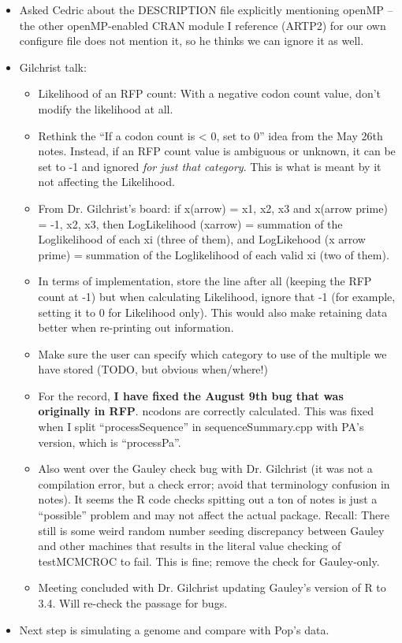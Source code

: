 \documentclass[12pt,hyperref]{labbook}
\begin{document}

\begin{itemize}
    \item Asked Cedric about the DESCRIPTION file explicitly mentioning openMP -- the other openMP-enabled CRAN module I reference (ARTP2) for our own configure file does not mention it, so he thinks we can ignore it as well.
    \item Gilchrist talk:
    \begin{itemize}
        \item Likelihood of an RFP count: With a negative codon count value, don't modify the likelihood at all.
        \item Rethink the \enquote{If a codon count is < 0, set to 0} idea from the May 26th notes. Instead, if an RFP count value is ambiguous or unknown, it can be set to -1 and ignored \textit{for just that category}. This is what is meant by it not affecting the Likelihood.
        \item From Dr. Gilchrist's board: if x(arrow) = {x1, x2, x3} and x(arrow prime) = {-1, x2, x3}, then LogLikelihood (xarrow) = summation of the Loglikelihood of each xi (three of them), and LogLikehood (x arrow prime) = summation of the Loglikelihood of each valid xi (two of them).
        \item In terms of implementation, store the line after all (keeping the RFP count at -1) but when calculating Likelihood, ignore that -1 (for example, setting it to 0 for Likelihood only).
        This would also make retaining data better when re-printing out information.
        \item Make sure the user can specify which category to use of the multiple we have stored (TODO, but obvious when/where!)
        \item For the record, \textbf{I have fixed the August 9th bug that was originally in RFP}. ncodons are correctly calculated. This was fixed when I split \enquote{processSequence} in sequenceSummary.cpp with PA's version, which is \enquote{processPa}.
        \item Also went over the Gauley check bug with Dr. Gilchrist (it was not a compilation error, but a check error; avoid that terminology confusion in notes). It seems the R code checks spitting out a ton of notes is just a \enquote{possible} problem and may not affect the actual package. Recall: There still is some weird random number seeding discrepancy between Gauley and other machines that results in the literal value checking of testMCMCROC to fail. This is fine; remove the check for Gauley-only.
        \item Meeting concluded with Dr. Gilchrist updating Gauley's version of R to 3.4. Will re-check the passage for bugs.
    \end{itemize}
    \item Next step is simulating a genome and compare with Pop's data.
\end{itemize}
\end{document}
